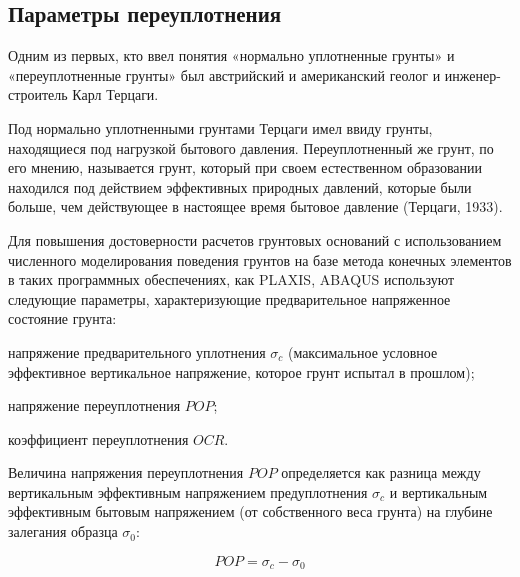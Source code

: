 %
%
%

\subsection{Параметры переуплотнения}

Одним из первых, кто ввел понятия «нормально уплотненные грунты»
и «переуплотненные грунты» был австрийский и американский геолог и инженер-
строитель Карл Терцаги.

Под нормально уплотненными грунтами Терцаги имел ввиду грунты, находящиеся
под нагрузкой бытового давления. Переуплотненный же грунт, по
его мнению, называется грунт, который при своем естественном образовании
находился под действием эффективных природных давлений, которые были
больше, чем действующее в настоящее время бытовое давление (Терцаги, 1933).

Для повышения достоверности расчетов грунтовых оснований 
с использованием численного моделирования поведения 
грунтов на базе метода конечных элементов в таких программных
обеспечениях, как PLAXIS, ABAQUS используют следующие 
параметры, характеризующие предварительное напряженное 
состояние грунта:

напряжение предварительного уплотнения $\sigma_c$ 
(максимальное условное эффективное вертикальное напряжение, 
которое грунт испытал в прошлом);

напряжение переуплотнения $POP$;

коэффициент переуплотнения $OCR$.

Величина напряжения переуплотнения $POP$ определяется 
как разница между вертикальным эффективным напряжением 
предуплотнения $\sigma_c$ и вертикальным эффективным бытовым напряжением 
(от собственного веса грунта) на глубине залегания образца $\sigma_0$:

\[
   POP = \sigma_c - \sigma_0
\]

